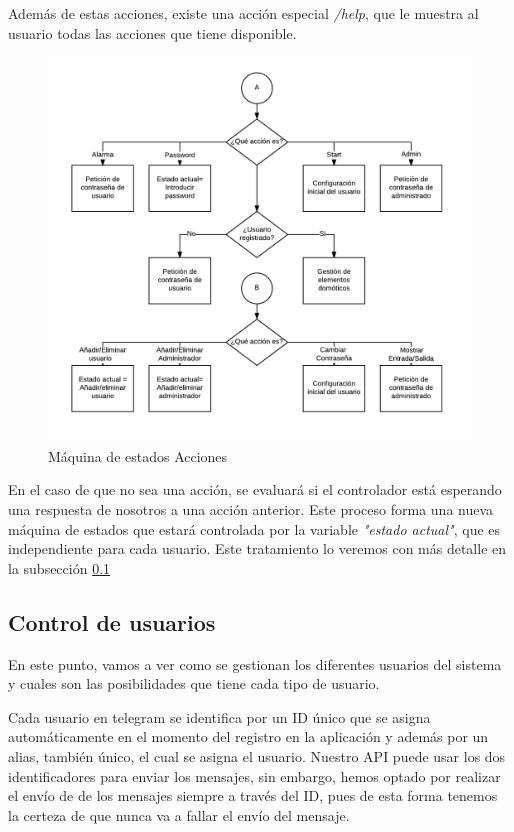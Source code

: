\documentclass[10pt,journal,compsoc]{IEEEtran}
\begin{document}
Además de estas acciones, existe una acción especial \textit{/help}, que le muestra al usuario 
todas las acciones que tiene disponible.

\begin{figure}[h]
\centering
\includegraphics[scale=0.4]{MaqEstAcc}
\caption{Máquina de estados Acciones}
\label{fig:MaqEstAcc}
\end{figure}

En el caso de que no sea una acción, se evaluará si el controlador está esperando una respuesta 
de nosotros a una acción anterior. Este proceso forma una nueva máquina de estados que estará 
controlada por la variable \textit{"estado actual"}, que es independiente para cada usuario.
Este tratamiento lo veremos con más detalle en la subsección \ref{sec:ControlUsuarios}

\subsection{Control de usuarios}\label{sec:ControlUsuarios}

En este punto, vamos a ver como se gestionan los diferentes usuarios del sistema y cuales 
son las posibilidades que tiene cada tipo de usuario.

Cada usuario en telegram se identifica por un ID único que se asigna automáticamente en 
el momento del registro en la aplicación y además por un alias, también único, el cual se asigna el 
usuario. Nuestro API puede usar los dos identificadores para enviar los  mensajes, sin embargo, 
hemos optado por realizar el envío de de los mensajes siempre a través del ID, pues de esta forma 
tenemos la certeza de que nunca va a fallar el envío del mensaje. 
\end{document}
